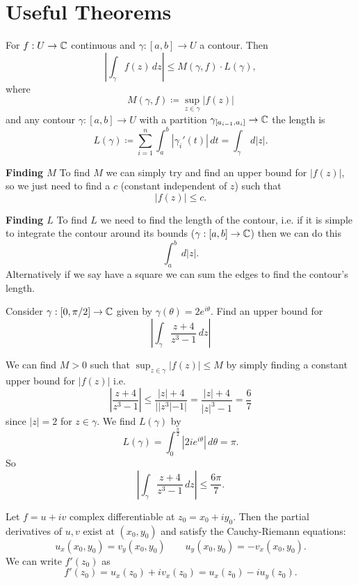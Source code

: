 \documentclass[11pt, a4paper]{article}
\begin{document}
\newpage

\section{Useful Theorems}

\begin{thmbox}
    For $f : U \to \mathbb{C}$ continuous and $\gamma : [a, b] \to U$ a contour.
    Then
    \[
    \left|\int_{\gamma}f(z)\,dz\right| \leq M(\gamma, f)\cdot L(\gamma),
    \]
    where
    \[
    M(\gamma, f) \coloneqq \sup_{z \in \gamma}|f(z)|
    \]
    and any contour $\gamma : [a, b] \to U$ with a partition $\gamma_{[a_{i - 1}, a_i]} \to \mathbb{C}$ the length is
    \[
    L(\gamma) \coloneqq \sum_{i = 1}^{n}\int_{a}^{b}|\gamma_i'(t)|\,dt = \int_{\gamma}\,d|z|.
    \]
\end{thmbox}

\begin{methodbox}
    \textbf{Finding $M$}
    To find $M$ we can simply try and find an upper bound for $|f(z)|$,
    so we just need to find a $c$
    (constant independent of $z$)
    such that
    \[
    |f(z)| \leq c.
    \]

    \textbf{Finding $L$}
    To find $L$ we need to find the length of the contour,
    i.e. if it is simple to integrate the contour around its bounds
    ($\gamma : [a, b] \to \mathbb{C}$)
    then we can do this
    \[
    \int_{a}^{b}\,d|z|.
    \]
    Alternatively if we say have a square we can sum the edges to find the contour's length.
\end{methodbox}

\begin{exbox}[]
    Consider $\gamma : [0, \pi / 2] \to \mathbb{C}$ given by $\gamma(\theta) = 2e ^ {i\theta}$.
    Find an upper bound for
    \[
    \left|\int_{\gamma}\frac{z + 4}{z ^ 3 - 1}\,dz\right|
    \]

    We can find $M > 0$ such that $\sup_{z \in \gamma}|f(z)| \leq M$ by simply finding a constant upper bound for $|f(z)|$ i.e.
    \[
    \left|\frac{z + 4}{z ^ 3 - 1}\right| \leq \frac{|z| + 4}{||z ^ 3| - 1|} = \frac{|z| + 4}{|z| ^ 3 - 1} = \frac{6}{7}
    \]
    since $|z| = 2$ for $z \in \gamma$.
    We find $L(\gamma)$ by
    \[
    L(\gamma) = \int_{0}^{\frac{\pi}{2}}|2ie ^ {i\theta}|\,d\theta = \pi.
    \]
    So
    \[
    \left|\int_{\gamma}\frac{z + 4}{z ^ 3 - 1}\,dz\right| \leq \frac{6\pi}{7}.
    \]
\end{exbox}

\begin{thmbox}
    Let $f = u + iv$ complex differentiable at $z_0 = x_0 + iy_0$.
    Then the partial derivatives of $u, v$ exist at $(x_0, y_0)$ and satisfy the Cauchy-Riemann equations:
    \[
    u_x(x_0, y_0) = v_y(x_0, y_0)\qquad u_y(x_0, y_0) = -v_x(x_0, y_0).
    \]
    We can write $f'(z_0)$ as
    \[
    f'(z_0) = u_x(z_0) + iv_x(z_0) = u_x(z_0) - iu_y(z_0).
    \]
\end{thmbox}
\end{document}

